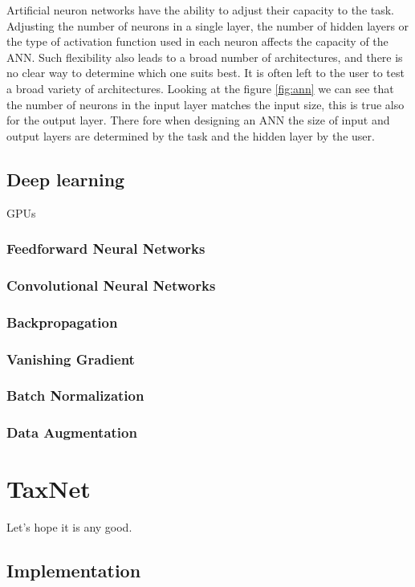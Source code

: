 \documentclass[times, utf8, diplomski]{fer}
\begin{document}
Artificial neuron networks have the ability to adjust their capacity to the task. Adjusting the number of neurons in a single layer, the number of hidden layers or the type of activation function used in each neuron affects the capacity of the ANN. Such flexibility also leads to a broad number of architectures, and there is no clear way to determine which one suits best. It is often left to the user to test a broad variety of architectures. Looking at the figure \ref{fig:ann} we can see that the number of neurons in the input layer matches the input size, this is true also for the output layer. There fore when designing an ANN the size of input and output layers are determined by the task and the hidden layer by the user.


\section{Deep learning}
GPUs

\subsection{Feedforward Neural Networks}
\subsection{Convolutional Neural Networks}
\subsection{Backpropagation}
\subsection{Vanishing Gradient}
\subsection{Batch Normalization}
\subsection{Data Augmentation}


\chapter{TaxNet}
Let's hope it is any good.
\section{Implementation}
\end{document}
